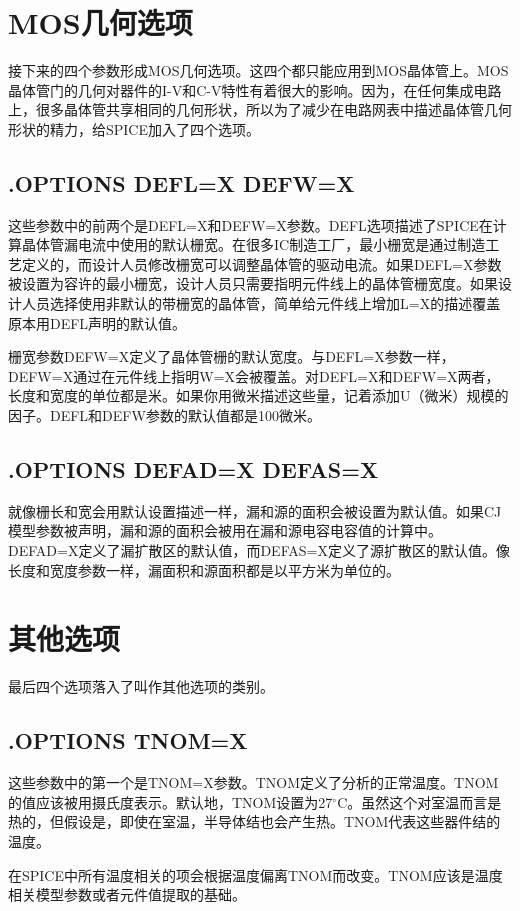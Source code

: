 \section{MOS几何选项}
接下来的四个参数形成MOS几何选项。这四个都只能应用到MOS晶体管上。MOS晶体管门的几何对器件的I-V和C-V特性有着很大的影响。因为，在任何集成电路上，很多晶体管共享相同的几何形状，所以为了减少在电路网表中描述晶体管几何形状的精力，给SPICE加入了四个选项。

\subsection{.OPTIONS DEFL=X DEFW=X}
这些参数中的前两个是DEFL=X和DEFW=X参数。DEFL选项描述了SPICE在计算晶体管漏电流中使用的默认栅宽。在很多IC制造工厂，最小栅宽是通过制造工艺定义的，而设计人员修改栅宽可以调整晶体管的驱动电流。如果DEFL=X参数被设置为容许的最小栅宽，设计人员只需要指明元件线上的晶体管栅宽度。如果设计人员选择使用非默认的带栅宽的晶体管，简单给元件线上增加L=X的描述覆盖原本用DEFL声明的默认值。

栅宽参数DEFW=X定义了晶体管栅的默认宽度。与DEFL=X参数一样，DEFW=X通过在元件线上指明W=X会被覆盖。对DEFL=X和DEFW=X两者，长度和宽度的单位都是米。如果你用微米描述这些量，记着添加U（微米）规模的因子。DEFL和DEFW参数的默认值都是100微米。

\subsection{.OPTIONS DEFAD=X DEFAS=X}
就像栅长和宽会用默认设置描述一样，漏和源的面积会被设置为默认值。如果CJ模型参数被声明，漏和源的面积会被用在漏和源电容电容值的计算中。DEFAD=X定义了漏扩散区的默认值，而DEFAS=X定义了源扩散区的默认值。像长度和宽度参数一样，漏面积和源面积都是以平方米为单位的。

\section{其他选项}
最后四个选项落入了叫作其他选项的类别。

\subsection{.OPTIONS TNOM=X}
这些参数中的第一个是TNOM=X参数。TNOM定义了分析的正常温度。TNOM的值应该被用摄氏度表示。默认地，TNOM设置为27$^{\circ}$C。虽然这个对室温而言是热的，但假设是，即使在室温，半导体结也会产生热。TNOM代表这些器件结的温度。

在SPICE中所有温度相关的项会根据温度偏离TNOM而改变。TNOM应该是温度相关模型参数或者元件值提取的基础。

